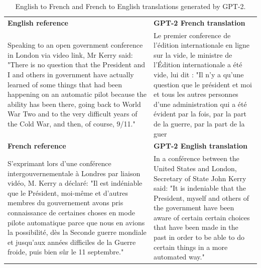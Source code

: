\documentclass{article}
\begin{document}
{\begin{table}[t]
\begin{center}
\begin{tabular}{|p{8cm}|p{8cm}|}
\hline
\hline

 \textbf{English reference} & \textbf{GPT-2 French translation} \\
Speaking to an open government conference in London via video link, Mr Kerry said: "There is no question that the President and I and others in government have actually learned of some things that had been happening on an automatic pilot because the ability has been there, going back to World War Two and to the very difficult years of the Cold War, and then, of course, 9/11." & Le premier conference de l'édition internationale en ligne sur la vide, le ministre de l'Édition internationale a été vide, lui dit : "Il n'y a qu'une question que le président et moi et tous les autres personnes d'une administration qui a été évident par la fois, par la part de la guerre, par la part de la guer \\
 \hline



\textbf{French reference} & \textbf{GPT-2 English translation}  \\
S'exprimant lors d'une conférence intergouvernementale à Londres par liaison vidéo, M. Kerry a déclaré: "Il est indéniable que le Président, moi-même et d'autres membres du gouvernement avons pris connaissance de certaines choses en mode pilote automatique parce que nous en avions la possibilité, dès la Seconde guerre mondiale et jusqu'aux années difficiles de la Guerre froide, puis bien sûr le 11 septembre."
& In a conférence between the United States and London, Secretary of State John Kerry said: "It is indeniable that the President, myself and others of the government have been aware of certain certain choices that have been made in the past in order to be able to do certain things in a more automated way." \\
\hline

\end{tabular}
\caption{English to French and French to English translations generated by GPT-2.}
\label{gentranslations}
\end{center}
\end{table}
}
\end{document}
